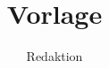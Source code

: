 \documentclass[8pt,a4paper]{scrartcl}
\title{Vorlage}
\author{Redaktion}
\newcommand{\topicolor}{white}
\begin{document}
\maketitle
\tableofcontents
\newpage

\renewcommand{\topicolor}{iot}
\end{document}
